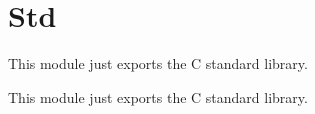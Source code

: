 \hypertarget{group___fa_std}{\section{Std}
\label{group___fa_std}
}


This module just exports the C standard library.  


This module just exports the C standard library. 